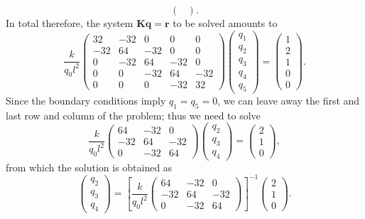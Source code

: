 \documentclass[a4paper,11pt]{article}
\numberwithin{equation}{section}
\newcommand\matr[1]{\ensuremath{\boldsymbol{\mathbf{#1}}}}
\newcommand\vect[1]{\ensuremath{\bm{#1}}}
\begin{document}
{\begin{equation}
\begin{pmatrix}
	\end{pmatrix}.
\end{equation} In total therefore, the system $\matr{K}\vect{q} = \vect{r}$ to be solved amounts to \begin{equation}
	\frac{k}{q_0l^2}\begin{pmatrix}
		32 & -32 & 0 & 0 & 0 \\
		-32 & 64 & -32 & 0 & 0 \\
		0 & -32 & 64 & -32 & 0 \\
		0 & 0 & -32 & 64 & -32 \\
		0 & 0 & 0 & -32 & 32
	\end{pmatrix}\begin{pmatrix}
		q_1 \\ q_2 \\ q_3 \\ q_4 \\ q_5
	\end{pmatrix} = \begin{pmatrix}
		1 \\ 2 \\ 1 \\ 0  \\ 0
	\end{pmatrix}.
\end{equation} Since the boundary conditions imply $q_1 = q_5 = 0$, we can leave away the first and last row and column of the problem; thus we need to solve 
\begin{equation}
	\frac{k}{q_0l^2}\begin{pmatrix}
		64 & -32 & 0 \\
		-32 & 64 & -32 \\
		0 & -32 & 64
	\end{pmatrix}\begin{pmatrix}
		q_2 \\ q_3 \\ q_4
	\end{pmatrix} = \begin{pmatrix}
		2 \\ 1 \\ 0
	\end{pmatrix}, 
\end{equation} from which the solution is obtained as \begin{equation}
	\begin{pmatrix}
		q_2 \\ q_3 \\ q_4
	\end{pmatrix} = \left[	\frac{k}{q_0l^2}\begin{pmatrix}
		64 & -32 & 0 \\
		-32 & 64 & -32 \\
		0 & -32 & 64
	\end{pmatrix}\right]^{-1}\begin{pmatrix}
		2 \\ 1 \\ 0
	\end{pmatrix}.
\end{equation}

}
\end{document}
